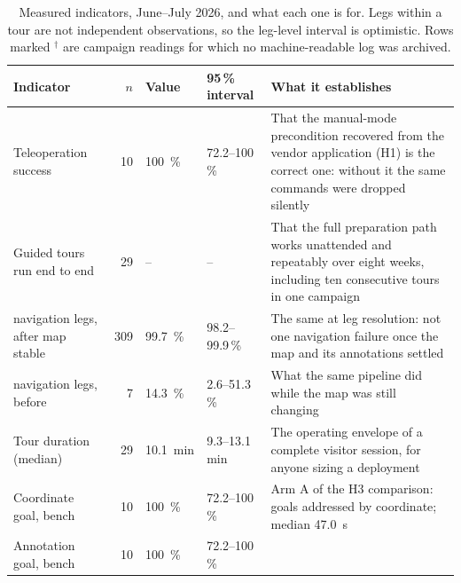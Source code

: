 %
%
\begin{table}[!t]
\caption{Measured indicators, June--July 2026, and what each one is for. Legs within a tour are
not independent observations, so the leg-level interval is optimistic. Rows marked $^{\dagger}$
are campaign readings for which no machine-readable log was archived.}
\label{tab:metrics}
\centering
\footnotesize
\setlength{\tabcolsep}{4pt}
\begin{tabular}{@{}p{3.2cm}rp{1.7cm}p{1.9cm}p{8.4cm}@{}}
\toprule
\textbf{Indicator} & \textbf{$n$} & \textbf{Value} & \textbf{95\,\% interval} & \textbf{What it establishes} \\
\midrule
Teleoperation success            & 10 & \SI{100}{\percent} & \numrange{72.2}{100}\,\% &
That the manual-mode precondition recovered from the vendor application (H1) is the correct one:
without it the same commands were dropped silently \\
Guided tours run end to end          & 29 & --                 & -- &
That the full preparation path works unattended and repeatably over eight weeks, including ten
consecutive tours in one campaign \\
\quad navigation legs, after map stable & 309 & \SI{99.7}{\percent} & \numrange{98.2}{99.9}\,\% &
The same at leg resolution: not one navigation failure once the map and its annotations settled \\
\quad navigation legs, before        & 7  & \SI{14.3}{\percent}& \numrange{2.6}{51.3}\,\% &
What the same pipeline did while the map was still changing \\
Tour duration (median)               & 29 & \SI{10.1}{\minute} & \numrange{9.3}{13.1}\,min &
The operating envelope of a complete visitor session, for anyone sizing a deployment \\
Coordinate goal, bench           & 10 & \SI{100}{\percent} & \numrange{72.2}{100}\,\% &
Arm A of the H3 comparison: goals addressed by coordinate; median \SI{47.0}{\second} \\
Annotation goal, bench           & 10 & \SI{100}{\percent} & \numrange{72.2}{100}\,\% &

\end{tabular}
\end{table}
